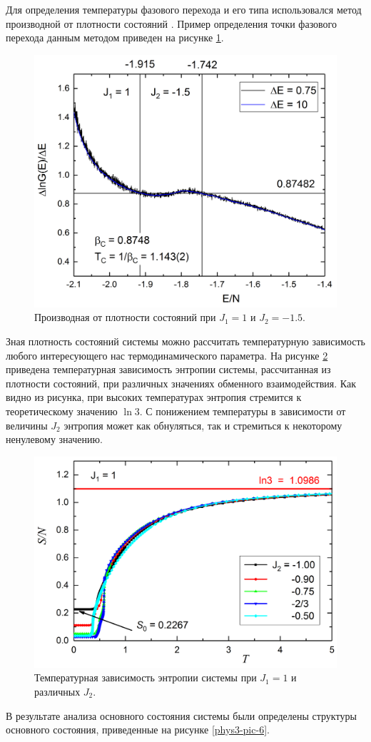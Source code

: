 Для определения температуры фазового перехода и его типа использовался метод производной от плотности состояний \cite{ph3_7}. Пример определения точки фазового перехода данным методом приведен на рисунке \ref{phys3-pic-4}.

\begin{figure}[H]
	\centering
	\includegraphics[width=0.5\linewidth]{content/sections/images/phys3-4}
	\caption{Производная от плотности состояний при $J_1 = 1$ и $J_2 = -1.5$.}
	\label{phys3-pic-4}
\end{figure}

Зная плотность состояний системы можно рассчитать температурную зависимость любого интересующего нас термодинамического параметра. На рисунке \ref{phys3-pic-5} приведена температурная зависимость энтропии системы, рассчитанная из плотности состояний, при различных значениях обменного взаимодействия. Как видно из рисунка, при высоких температурах энтропия стремится к теоретическому значению $\ln{3}$. С понижением температуры в зависимости от величины $J_2$ энтропия может как обнуляться, так и стремиться к некоторому ненулевому значению.

\begin{figure}[H]
	\centering
	\includegraphics[width=0.5\linewidth]{content/sections/images/phys3-5}
	\caption{Температурная зависимость энтропии системы при $J_1 = 1$ и различных $J_2$.}
	\label{phys3-pic-5}
\end{figure}

В результате анализа основного состояния системы были определены структуры основного состояния, приведенные на рисунке \ref{phys3-pic-6}.

